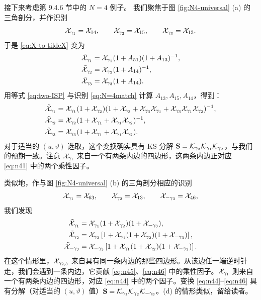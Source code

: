 接下来考虑第 9.4.6 节中的 $N=4$ 例子。%
我们聚焦于图 \ref{fig:N4-universal} (a) 的三角剖分，并作识别
\begin{equation}\label{eq:N=4match}
\mathcal{X}_{\gamma_1}=\mathcal{X}_{14},\qquad\mathcal{X}_{\gamma_2}=\mathcal{X}_{15},\qquad\mathcal{X}_{\gamma_3}=\mathcal{X}_{13}.
\end{equation}
于是 \eqref{eq:X-to-tildeX} 变为
\begin{align}
\tilde{\mathcal{X}}_{\gamma_1}&=\mathcal{X}_{\gamma_1}(1+A_{51})(1+A_{13})^{-1},\\
\tilde{\mathcal{X}}_{\gamma_2}&=\mathcal{X}_{\gamma_2}(1+A_{14})^{-1},\\
\tilde{\mathcal{X}}_{\gamma_3}&=\mathcal{X}_{\gamma_3}(1+A_{14}).
\end{align}
用等式 \eqref{eq:two-ISP} 与识别 \eqref{eq:N=4match} 计算 $A_{13},A_{15},A_{14}$，得到：
\begin{align}
\tilde{\mathcal{X}}_{\gamma_1}&=\mathcal{X}_{\gamma_1}(1+\mathcal{X}_{\gamma_2})(1+\mathcal{X}_{\gamma_3}+\mathcal{X}_{\gamma_3}\mathcal{X}_{\gamma_1}+\mathcal{X}_{\gamma_3}\mathcal{X}_{\gamma_1}\mathcal{X}_{\gamma_2})^{-1},\label{eq:n41}\\
\tilde{\mathcal{X}}_{\gamma_2}&=\mathcal{X}_{\gamma_2}(1+\mathcal{X}_{\gamma_1}+\mathcal{X}_{\gamma_1}\mathcal{X}_{\gamma_2})^{-1},\label{eq:n42}\\
\tilde{\mathcal{X}}_{\gamma_3}&=\mathcal{X}_{\gamma_3}(1+\mathcal{X}_{\gamma_1}+\mathcal{X}_{\gamma_1}\mathcal{X}_{\gamma_2}).\label{eq:n43}
\end{align}
对于适当的 $(u,\vartheta)$ 选取，这个变换确实具有 KS 分解 $\mathbf S=\mathcal{K}_{\gamma_3}\mathcal{K}_{\gamma_1}\mathcal{K}_{\gamma_2}$，与我们的预期一致。注意 $\mathcal{X}_{\gamma_1}$ 来自一个有两条内边的四边形，这两条内边正对应 \eqref{eq:n41} 中的两个乘性因子。

类似地，作与图 \ref{fig:N4-universal} (b) 的三角剖分相应的识别
\begin{equation}\label{eq:N=4match-b}
\mathcal{X}_{\gamma_1}=\mathcal{X}_{63},\qquad\mathcal{X}_{\gamma_2}=\mathcal{X}_{13},\qquad\mathcal{X}_{-\gamma_3}=\mathcal{X}_{46},
\end{equation}
我们发现
\begin{align}
\tilde{\mathcal{X}}_{\gamma_1}&=\mathcal{X}_{\gamma_1}(1+\mathcal{X}_{\gamma_2})(1+\mathcal{X}_{-\gamma_3}),\label{eq:n44}\\
\tilde{\mathcal{X}}_{\gamma_2}&=\mathcal{X}_{\gamma_2}\left[1+\mathcal{X}_{\gamma_1}(1+\mathcal{X}_{\gamma_2})(1+\mathcal{X}_{-\gamma_3})\right],\label{eq:n45}\\
\tilde{\mathcal{X}}_{-\gamma_3}&=\mathcal{X}_{-\gamma_3}\left[1+\mathcal{X}_{\gamma_1}(1+\mathcal{X}_{\gamma_2})(1+\mathcal{X}_{-\gamma_3})\right].\label{eq:n46}
\end{align}
在这个情形里，$\mathcal{X}_{\gamma_{2,3}}$ 来自具有同一条内边的那些四边形。从该边任一端逆时针走，我们会遇到一条内边，它贡献 \eqref{eq:n45}、\eqref{eq:n46} 中的乘性因子。$\mathcal{X}_{\gamma_1}$ 则来自一个有两条内边的四边形，对应 \eqref{eq:n44} 中的两个因子。变换 \eqref{eq:n44}--\eqref{eq:n46} 具有分解（对适当的 $(u,\vartheta)$ 值）$\mathbf S=\mathcal{K}_{\gamma_1}\mathcal{K}_{\gamma_2}\mathcal{K}_{-\gamma_3}$。(d) 的情形类似，留给读者。

